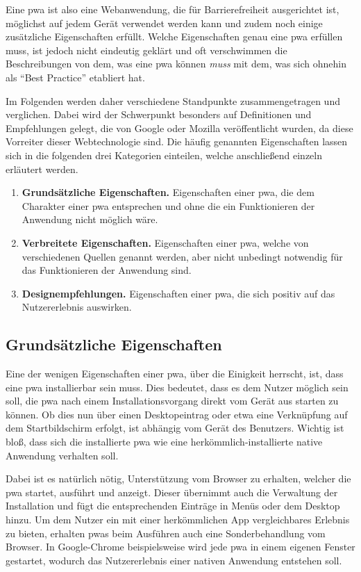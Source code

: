 \documentclass[11pt, parskip=half]{scrartcl}       %
\newcommand\litem[1]{\item{\bfseries#1.\space}}
\begin{document}
Eine \ac{pwa} ist also eine Webanwendung, die für Barrierefreiheit ausgerichtet ist, möglichst auf jedem Gerät verwendet werden kann und zudem noch einige zusätzliche Eigenschaften erfüllt.
Welche Eigenschaften genau eine \ac{pwa} erfüllen muss, ist jedoch nicht eindeutig geklärt und oft verschwimmen die Beschreibungen von dem, was eine \ac{pwa} können \textit{muss} mit dem, was sich ohnehin als \enquote{Best Practice} etabliert hat.

Im Folgenden werden daher verschiedene Standpunkte zusammengetragen und verglichen.
Dabei wird der Schwerpunkt besonders auf Definitionen und Empfehlungen gelegt, die von Google oder Mozilla veröffentlicht wurden, da diese Vorreiter dieser Webtechnologie sind.
Die häufig genannten Eigenschaften lassen sich in die folgenden drei Kategorien einteilen, welche anschließend einzeln erläutert werden.

\begin{enumerate}
  \litem{Grundsätzliche Eigenschaften} Eigenschaften einer \ac{pwa}, die dem Charakter einer \ac{pwa} entsprechen und ohne die ein Funktionieren der Anwendung nicht möglich wäre.

  \litem{Verbreitete Eigenschaften} Eigenschaften einer \ac{pwa}, welche von verschiedenen Quellen genannt werden, aber nicht unbedingt notwendig für das Funktionieren der Anwendung sind.

  \litem{Designempfehlungen} Eigenschaften einer \ac{pwa}, die sich positiv auf das Nutzererlebnis auswirken.
\end{enumerate}


\subsection{Grundsätzliche Eigenschaften}

Eine der wenigen Eigenschaften einer \ac{pwa}, über die Einigkeit herrscht, ist, dass eine \ac{pwa} installierbar sein muss.
Dies bedeutet, dass es dem Nutzer möglich sein soll, die \ac{pwa} nach einem Installationsvorgang direkt vom Gerät aus starten zu können.
Ob dies nun über einen Desktopeintrag oder etwa eine Verknüpfung auf dem Startbildschirm erfolgt, ist abhängig vom Gerät des Benutzers.
Wichtig ist bloß, dass sich die installierte \ac{pwa} wie eine herkömmlich-installierte native Anwendung verhalten soll.

Dabei ist es natürlich nötig, Unterstützung vom Browser zu erhalten, welcher die \ac{pwa} startet, ausführt und anzeigt.
Dieser übernimmt auch die Verwaltung der Installation und fügt die entsprechenden Einträge in Menüs oder dem Desktop hinzu.
Um dem Nutzer ein mit einer herkömmlichen App vergleichbares Erlebnis zu bieten, erhalten \acp{pwa} beim Ausführen auch eine Sonderbehandlung vom Browser.
In Google-Chrome beispielsweise wird jede \ac{pwa} in einem eigenen Fenster gestartet, wodurch das Nutzererlebnis einer nativen Anwendung entstehen soll\cite{googledevs_pwa}.
\end{document}
